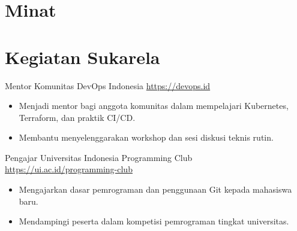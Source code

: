 \documentclass[a4paper, serif, 10pt]{moderncv}
\begin{document}
\section{Minat}

\section{Kegiatan Sukarela}

        {Mentor}
        {Komunitas DevOps Indonesia}
        {\url{https://devops.id}}
        {}
        {\begin{itemize}
\item Menjadi mentor bagi anggota komunitas dalam mempelajari Kubernetes, Terraform, dan praktik CI/CD.
\item Membantu menyelenggarakan workshop dan sesi diskusi teknis rutin.
\end{itemize}}
    

        {Pengajar}
        {Universitas Indonesia Programming Club}
        {\url{https://ui.ac.id/programming-club}}
        {}
        {\begin{itemize}
\item Mengajarkan dasar pemrograman dan penggunaan Git kepada mahasiswa baru.
\item Mendampingi peserta dalam kompetisi pemrograman tingkat universitas.
\end{itemize}}
    
\end{document}
